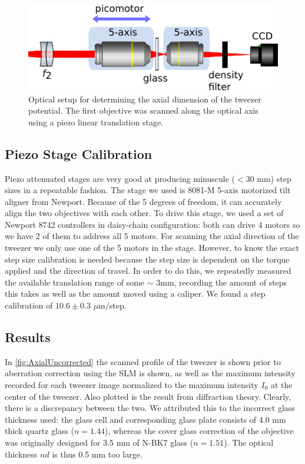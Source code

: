 \begin{figure}
    \centering
    \includegraphics[width=0.6\linewidth]{figures/ZScanSetup.pdf}
    \caption{Optical setup for determining the axial dimension of the tweezer potential. The first objective was scanned along the optical axis using a piezo linear translation stage.}
    \label{fig:ZScanSetup}
\end{figure}


\subsection{Piezo Stage Calibration}

Piezo attenuated stages are very good at producing minuscule ($<30$ mm) step sizes in a repeatable fashion.
The stage we used is 8081-M 5-axis motorized tilt aligner from Newport. 
Because of the 5 degrees of freedom, it can accurately align the two objectives with each other. 
To drive this stage, we used a set of Newport 8742 controllers in daisy-chain configuration: both can drive 4 motors so we have 2 of them to address all 5 motors.
For scanning the axial direction of the tweezer we only use one of the 5 motors in the stage. 
However, to know the exact step size calibration is needed because the step size is dependent on the torque applied and the direction of travel.
In order to do this, we repeatedly measured the available translation range of some $\sim$ 3mm, recording the amount of steps this takes as well as the amount moved using a caliper. 
We found a step calibration of $10.6 \pm 0.3$ $\mu$m/step.

\subsection{Results}

In \cref{fig:AxialUncorrected} the scanned profile of the tweezer is shown prior to aberration correction using the \ac{SLM} is shown, as well as the maximum intensity recorded for each tweezer image normalized to the maximum intensity $I_0$ at the center of the tweezer.
Also plotted is the result from diffraction theory.
Clearly, there is a discrepancy between the two. 
We attributed this to the incorrect glass thickness used: the glass cell and corresponding glass plate consists of 4.0 mm thick quartz glass ($n=1.44$), whereas the cover glass correction of the objective was originally designed for 3.5 mm of N-BK7 glass ($n=1.51$).
The optical thickness $nd$ is thus 0.5 mm too large. 

